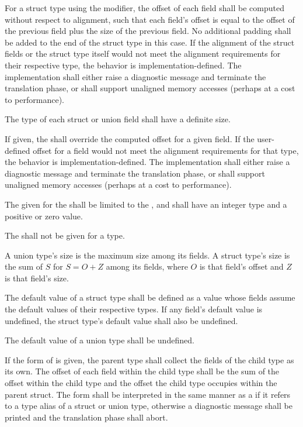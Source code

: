\specsubsubitem
For a struct type using the  modifier, the offset of each
field shall be computed without respect to alignment, such that each field's
offset is equal to the offset of the previous field plus the size of the
previous field. No additional padding shall be added to the end of the struct
type in this case. If the alignment of the struct fields or the struct type
itself would not meet the alignment requirements for their respective type, the
behavior is implementation-defined. The implementation shall either raise a
diagnostic message and terminate the translation phase, or shall support
unaligned memory accesses (perhaps at a cost to performance).

\specsubsubitem
The type of each struct or union field shall have a definite size.

\specsubsubitem
If given, the  shall override the computed offset
for a given field. If the user-defined offset for a field would not meet the
alignment requirements for that type, the behavior is implementation-defined.
The implementation shall either raise a diagnostic message and terminate the
translation phase, or shall support unaligned memory accesses (perhaps at a
cost to performance).

\specsubsubitem
The  given for the  shall
be limited to the , and
shall have an integer type and a positive or zero value.

\specsubsubitem
The  shall not be given for a 
type.

\specsubsubitem
A union type's size is the maximum size among its fields. A struct type's size
is the sum of $S$ for $S = O+Z$ among its fields, where $O$ is that
field's offset and $Z$ is that field's size.

\specsubsubitem
The default value of a struct type shall be defined as a value whose fields
assume the default values of their respective types. If any field's default
value is undefined, the struct type's default value shall also be undefined.

\specsubsubitem
The default value of a union type shall be undefined.

\specsubsubitem
If the  form of 
is given, the parent type shall collect the fields of the child type as its
own. The offset of each field within the child type shall be the sum of the
offset within the child type and the offset the child type occupies within the
parent struct. The  form shall be interpreted in the same
manner as a  if it refers to a type alias of a
struct or union type, otherwise a diagnostic message shall be printed and the
translation phase shall abort.


